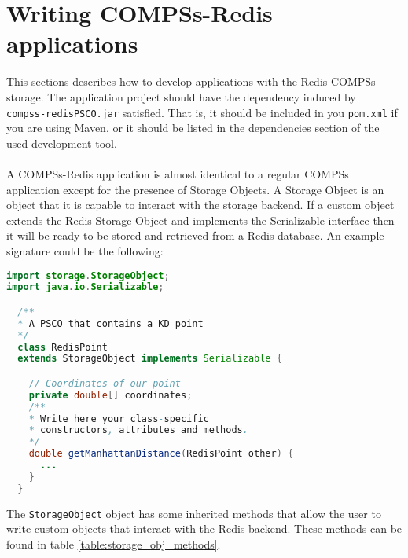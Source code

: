 \documentclass{article}
\begin{document}
\section{Writing COMPSs-Redis applications}
This sections describes how to develop applications with the Redis-COMPSs storage. The application project should have the dependency induced by \\ \verb|compss-redisPSCO.jar| satisfied. That is, it should be included in you \verb|pom.xml| if you are using Maven, or it should be listed in the dependencies section of the used development tool.\\
\\
A COMPSs-Redis application is almost identical to a regular COMPSs application except for the presence of Storage Objects. A Storage Object is an object that it is capable to interact with the storage backend. If a custom object extends the Redis Storage Object and implements the Serializable interface then it will be ready to be stored and retrieved from a Redis database. An example signature could be the following:
\newpage
\begin{lstlisting}[language=java]
import storage.StorageObject;
import java.io.Serializable;

  /**
  * A PSCO that contains a KD point
  */
  class RedisPoint 
  extends StorageObject implements Serializable {

    // Coordinates of our point
    private double[] coordinates;
    /**
    * Write here your class-specific
    * constructors, attributes and methods.
    */
    double getManhattanDistance(RedisPoint other) {
      ...
    }
  }
\end{lstlisting}
  The \verb|StorageObject| object has some inherited methods that allow the user to write custom objects that interact with the Redis backend. These methods can be found in table \ref{table:storage_obj_methods}.
\end{document}
